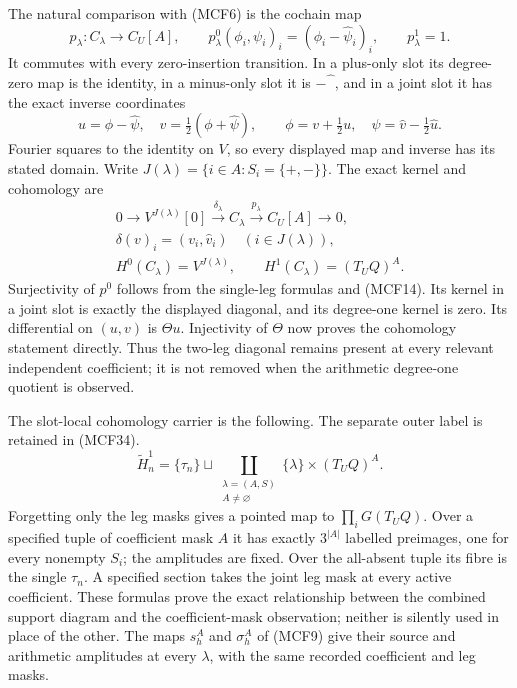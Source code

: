 The natural comparison with (MCF6) is the cochain map
\[
p_\lambda:C_\lambda\longrightarrow C_U[A],\qquad
p_\lambda^0(\phi_i,\psi_i)_i
       =(\phi_i-\widehat\psi_i)_i,\qquad
p_\lambda^1=1.
\tag{MCF13}
\]
It commutes with every zero-insertion transition.  In a plus-only slot
its degree-zero map is the identity, in a minus-only slot it is
$-\widehat{\phantom\phi}$, and in a joint slot it has the exact inverse
coordinates
\[
u=\phi-\widehat\psi,\quad v=\tfrac12(\phi+\widehat\psi),\qquad
\phi=v+\tfrac12u,\quad\psi=\widehat v-\tfrac12\widehat u.
\tag{MCF14}
\]
Fourier squares to the identity on $V$, so every displayed map and
inverse has its stated domain.  Write
$J(\lambda)=\{i\in A:S_i=\{+,-\}\}$.  The exact kernel and cohomology are
\[
\begin{gathered}
0\longrightarrow V^{J(\lambda)}[0]
\xrightarrow{\delta_\lambda} C_\lambda
\xrightarrow{p_\lambda} C_U[A]\longrightarrow0,\\
\delta(v)_i=(v_i,\widehat v_i)\quad(i\in J(\lambda)),\\
H^0(C_\lambda)=V^{J(\lambda)},\qquad
H^1(C_\lambda)=(T_UQ)^A.
\end{gathered}
\tag{MCF15}
\]
Surjectivity of $p^0$ follows from the single-leg formulas and (MCF14).
Its kernel in a joint slot is exactly the displayed diagonal, and its
degree-one kernel is zero.  Its differential on $(u,v)$ is $\Theta u$.
Injectivity of $\Theta$ now proves the cohomology statement directly.
Thus the two-leg diagonal remains present at every relevant independent
coefficient; it is not removed when the arithmetic degree-one quotient
is observed.

The slot-local cohomology carrier is the following.  The separate outer
label is retained in (MCF34).
\[
\widetilde H_n^1
=\{\tau_n\}\sqcup
 \coprod_{\substack{\lambda=(A,S)\\ A\ne\varnothing}}
               \{\lambda\}\times(T_UQ)^A.
\tag{MCF16}
\]
Forgetting only the leg masks gives a pointed map to $\prod_iG(T_UQ)$.
Over a specified tuple of coefficient mask $A$ it has exactly
$3^{|A|}$ labelled preimages, one for every nonempty $S_i$; the amplitudes
are fixed.  Over the all-absent tuple its fibre is the single $\tau_n$.
A specified section takes the joint leg mask at every active coefficient.
These formulas prove the exact relationship between the combined support
diagram and the coefficient-mask observation; neither is silently used
in place of the other.  The maps $s_h^A$ and $\sigma_h^A$ of (MCF9)
give their source and arithmetic amplitudes at every $\lambda$, with the
same recorded coefficient and leg masks.

